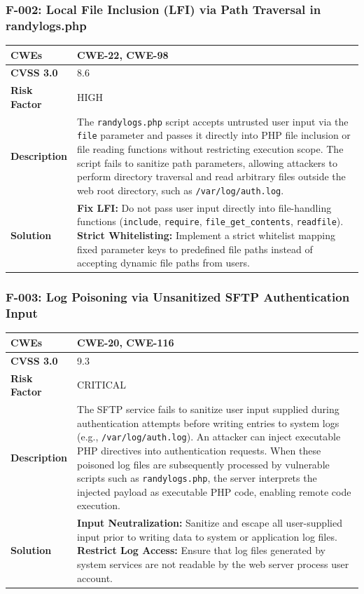 \subsubsection{F-002: Local File Inclusion (LFI) via Path Traversal in randylogs.php}
\begin{tabular}{|p{2.8cm}|p{12.2cm}|}
\hline
\textbf{CWEs} & CWE-22, CWE-98 \\ \hline
\textbf{CVSS 3.0} & 8.6 \\ \hline
\textbf{Risk Factor} & HIGH \\ \hline
\textbf{Description} & The \texttt{randylogs.php} script accepts untrusted user input via the \texttt{file} parameter and passes it directly into PHP file inclusion or file reading functions without restricting execution scope. The script fails to sanitize path parameters, allowing attackers to perform directory traversal and read arbitrary files outside the web root directory, such as \texttt{/var/log/auth.log}. \\ \hline
\textbf{Solution} & \textbf{Fix LFI:} Do not pass user input directly into file-handling functions (\texttt{include}, \texttt{require}, \texttt{file\_get\_contents}, \texttt{readfile}). \newline \textbf{Strict Whitelisting:} Implement a strict whitelist mapping fixed parameter keys to predefined file paths instead of accepting dynamic file paths from users. \\ \hline
\end{tabular}

\subsubsection{F-003: Log Poisoning via Unsanitized SFTP Authentication Input}
\begin{tabular}{|p{2.8cm}|p{12.2cm}|}
\hline
\textbf{CWEs} & CWE-20, CWE-116 \\ \hline
\textbf{CVSS 3.0} & 9.3 \\ \hline
\textbf{Risk Factor} & CRITICAL \\ \hline
\textbf{Description} & The SFTP service fails to sanitize user input supplied during authentication attempts before writing entries to system logs (e.g., \texttt{/var/log/auth.log}). An attacker can inject executable PHP directives into authentication requests. When these poisoned log files are subsequently processed by vulnerable scripts such as \texttt{randylogs.php}, the server interprets the injected payload as executable PHP code, enabling remote code execution. \\ \hline
\textbf{Solution} & \textbf{Input Neutralization:} Sanitize and escape all user-supplied input prior to writing data to system or application log files. \newline \textbf{Restrict Log Access:} Ensure that log files generated by system services are not readable by the web server process user account. \\ \hline
\end{tabular}

